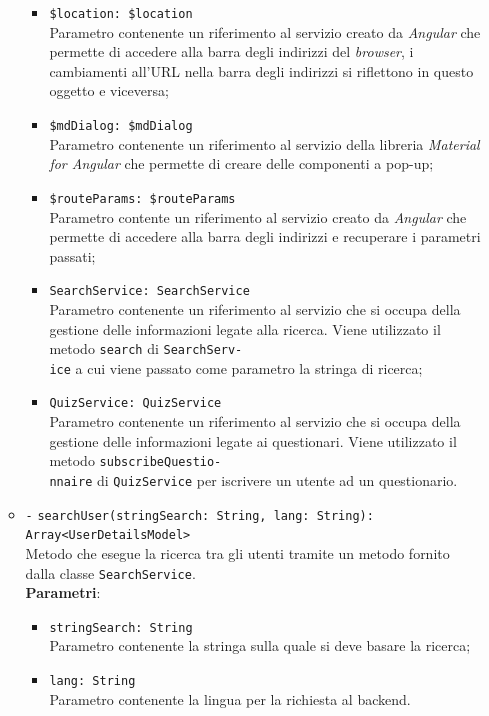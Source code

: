 \begin{itemize}
\begin{itemize}
\begin{itemize}
			\item \texttt{\$location: \$location} \\
			Parametro contenente un riferimento al servizio creato da \textit{Angular} che permette di accedere alla barra degli indirizzi del \textit{browser}, i cambiamenti all'URL nella barra degli indirizzi si riflettono in questo oggetto e viceversa;
			\item \texttt{\$mdDialog: \$mdDialog} \\
			Parametro contenente un riferimento al servizio della libreria \textit{Material for Angular} che permette di creare delle componenti a pop-up;
			\item \texttt{\$routeParams: \$routeParams} \\
			Parametro contente un riferimento al servizio creato da \textit{Angular} che permette di accedere alla barra degli indirizzi e recuperare i parametri passati;
			\item \texttt{SearchService: SearchService} \\
			Parametro contenente un riferimento al servizio che si occupa della gestione delle informazioni legate alla ricerca. Viene utilizzato il metodo \texttt{search} di \texttt{SearchServ-\\ice} a cui viene passato come parametro la stringa di ricerca;
			\item \texttt{QuizService: QuizService} \\
			Parametro contenente un riferimento al servizio che si occupa della gestione delle informazioni legate ai questionari. Viene utilizzato il metodo \texttt{subscribeQuestio-\\nnaire} di \texttt{QuizService} per iscrivere un utente ad un questionario.
		\end{itemize} 
		\item \texttt{-} \texttt{searchUser(stringSearch: String, lang: String): Array<UserDetailsModel>} \\
		Metodo che esegue la ricerca tra gli utenti tramite un metodo fornito dalla classe \texttt{SearchService}. \\
		\textbf{Parametri}:
		\begin{itemize}
			\item \texttt{stringSearch: String} \\
			Parametro contenente la stringa sulla quale si deve basare la ricerca;
			\item \texttt{lang: String} \\
			Parametro contenente la lingua per la richiesta al backend.

\end{itemize}
\end{itemize}
\end{itemize}
